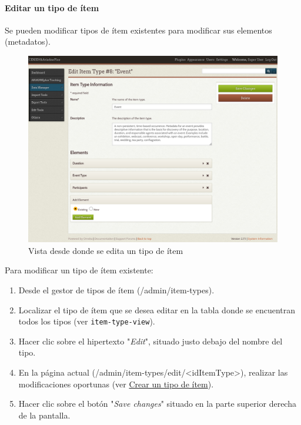 \documentclass[
]{article}
\providecommand{\tightlist}{%
  \setlength{\itemsep}{0pt}\setlength{\parskip}{0pt}}
\begin{document}
\hypertarget{editar-un-tipo-de-uxedtem}{%
\paragraph{Editar un tipo de ítem}\label{editar-un-tipo-de-uxedtem}}

Se pueden modificar tipos de ítem existentes para modificar sus
elementos (metadatos).

\begin{figure}
\hypertarget{edit-item-type}{%
\centering
\includegraphics{../_static/images/edit-item-type.png}
\caption{Vista desde donde se edita un tipo de
ítem}\label{edit-item-type}
}
\end{figure}

Para modificar un tipo de ítem existente:

\begin{enumerate}
\def\labelenumi{\arabic{enumi}.}
\tightlist
\item
  Desde el gestor de tipos de ítem ({/admin/item-types}).
\item
  Localizar el tipo de ítem que se desea editar en la tabla donde se
  encuentran todos los tipos (ver \texttt{item-type-view}).
\item
  Hacer clic sobre el hipertexto "\emph{Edit}", situado justo debajo del
  nombre del tipo.
\item
  En la página actual
  ({/admin/item-types/edit/\textless idItemType\textgreater{}}),
  realizar las modificaciones oportunas (ver
  \protect\hyperlink{crear-un-tipo-de-uxedtem}{Crear un tipo de ítem}).
\item
  Hacer clic sobre el botón "\emph{Save changes}" situado en la parte
  superior derecha de la pantalla.
\end{enumerate}
\end{document}
